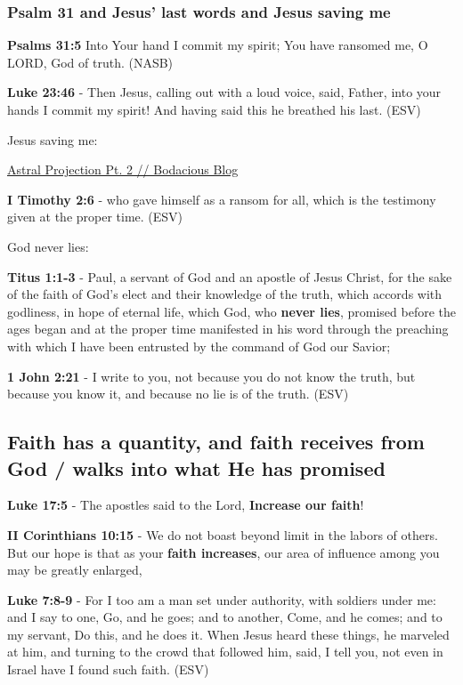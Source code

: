 \documentclass[11pt]{article}
\begin{document}
\subsubsection{Psalm 31 and Jesus' last words and Jesus saving me}
\label{sec:org6141d58}

\textbf{Psalms 31:5}  Into Your hand I commit my spirit; You have ransomed me, O LORD, God of truth.  (NASB)

\textbf{Luke 23:46} - Then Jesus, calling out with a loud voice, said, Father, into your hands I commit my spirit! And having said this he breathed his last.  (ESV)

Jesus saving me:

\href{https://web.archive.org/web/20220402091720/https://mullikine.github.io/posts/astral-projection-pt-2/}{Astral Projection Pt. 2 // Bodacious Blog}

\textbf{I Timothy 2:6} - who gave himself as a ransom for all, which is the testimony given at the proper time. (ESV)

God never lies:

\textbf{Titus 1:1-3} - Paul, a servant of God and an apostle of Jesus Christ, for the sake of the faith of God's elect and their knowledge of the truth, which accords with godliness, in hope of eternal life, which God, who \textbf{never lies}, promised before the ages began and at the proper time manifested in his word through the preaching with which I have been entrusted by the command of God our Savior;

\textbf{1 John 2:21} -  I write to you, not because you do not know the truth, but because you know it, and because no lie is of the truth.  (ESV)

\subsection{Faith has a quantity, and faith receives from God / walks into what He has promised}
\label{sec:org33c24a7}
\textbf{Luke 17:5} - The apostles said to the Lord, \textbf{Increase our faith}!

\textbf{II Corinthians 10:15} - We do not boast beyond limit in the labors of others. But our hope is that as your \textbf{faith increases}, our area of influence among you may be greatly enlarged,

\textbf{Luke 7:8-9} - For I too am a man set under authority, with soldiers under me: and I say to one, Go, and he goes; and to another, Come, and he comes; and to my servant, Do this, and he does it. When Jesus heard these things, he marveled at him, and turning to the crowd that followed him, said, I tell you, not even in Israel have I found such faith. (ESV)
\end{document}
